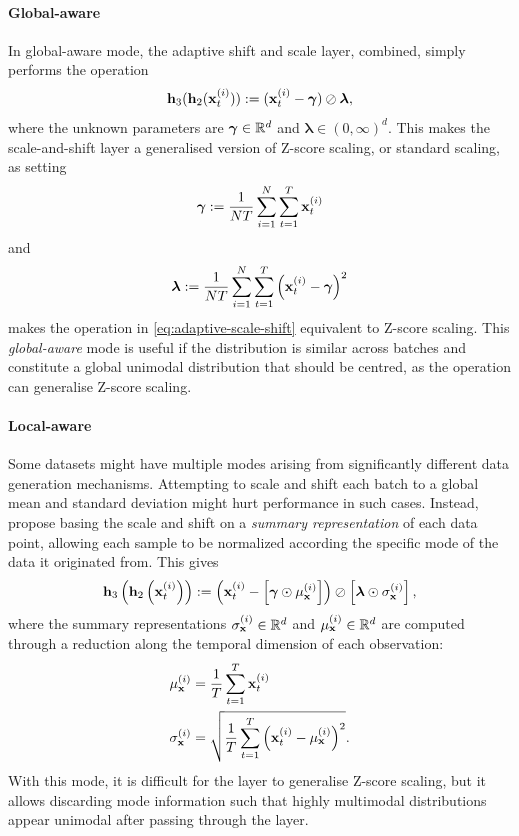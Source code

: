 \documentclass{statsmsc}
\begin{document}
{\paragraph{Global-aware}%
\label{par:Global-aware}

In global-aware mode, the adaptive shift and scale layer, combined, simply performs the operation
\begin{equation}\label{eq:adaptive-scale-shift}
    \mathbf{h}_3(\mathbf{h}_2(\mathbf{x}_t^{(i)})):=(\mathbf{x}_t^{(i)} - \bm\gamma) \oslash \bm\lambda,
\end{equation}
where the unknown parameters are $\bm\gamma \in \mathbb{R}^d$ and $\bm\lambda \in (0,\infty)^d$.
This makes the scale-and-shift layer a generalised version of
Z-score scaling, or standard scaling, as setting
\begin{equation}
    \bm\gamma:=\frac{1}{N T}  \sum^{N}_{i=1} \sum^{T}_{t=1} \mathbf{x}_{t}^{(i)}
\end{equation}
and
\begin{equation}
    \bm\lambda:=\frac{1}{N T} \sum^{N}_{i=1} \sum^{T}_{t=1} \left(\mathbf{x}_{t}^{(i)}- \bm\gamma\right)^2
\end{equation}
makes the operation in \cref{eq:adaptive-scale-shift} equivalent to Z-score scaling.
This \textit{global-aware} mode is useful if the distribution is similar across batches
and constitute a global unimodal distribution that should be centred, as the operation can generalise Z-score scaling.

\paragraph{Local-aware}%
\label{par:Local-aware}

Some datasets might have multiple modes arising from significantly different
data generation mechanisms. Attempting to scale and shift each batch to a global mean and
standard deviation might hurt performance in such cases. Instead, \citeauthor{dain} propose
basing the scale and shift on a \textit{summary representation} of each data point, allowing
each sample to be normalized according the specific mode  of the data it originated from.
This gives
\begin{equation}
    \mathbf{h}_3\left(\mathbf{h}_2\left(\mathbf{x}_t^{(i)}\right)\right):=
    \left(\mathbf{x}_t^{(i)} - \left[\bm\gamma \odot \mu_{\mathbf{x}}^{(i)}\right]\right) \oslash \left[\bm\lambda \odot \sigma_{\mathbf{x}}^{(i)}\right],
\end{equation}
where the summary representations $\sigma_{\mathbf{x}}^{(i)} \in \mathbb{R}^d$ and $\mu_{\mathbf{x}}^{(i)} \in \mathbb{R}^d$ are computed through a reduction
along the temporal dimension of each observation:
\begin{align}
    \mu_{\mathbf{x}}^{(i)}&=\frac{1}{T} \sum^{T}_{t=1} \mathbf{x}^{(i)}_t  \\
    \sigma_{\mathbf{x}}^{(i)}&=\sqrt{\frac{1}{T}  \sum^{T}_{t=1} \left(\mathbf{x}^{(i)}_t- \mu_{\mathbf{x}}^{(i)} \right)^2}.
\end{align}
With this mode, it is difficult for the layer to generalise Z-score scaling, but it allows
discarding mode information such that highly multimodal distributions appear unimodal after passing
through the layer.

}
\end{document}
